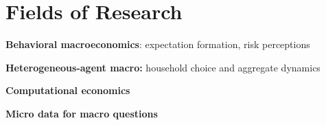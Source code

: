 \vspace{0.2in}
\section{Fields of Research} %
\label{sec:research_backg}
\vspace{-0.25in}
\begin{outerlist}
	\item {\bf Behavioral macroeconomics}: expectation formation, risk perceptions
	\item {\bf Heterogeneous-agent macro:} household choice and aggregate dynamics 
	\item {\bf Computational economics}
	\item {\bf Micro data for macro questions}
\end{outerlist}
